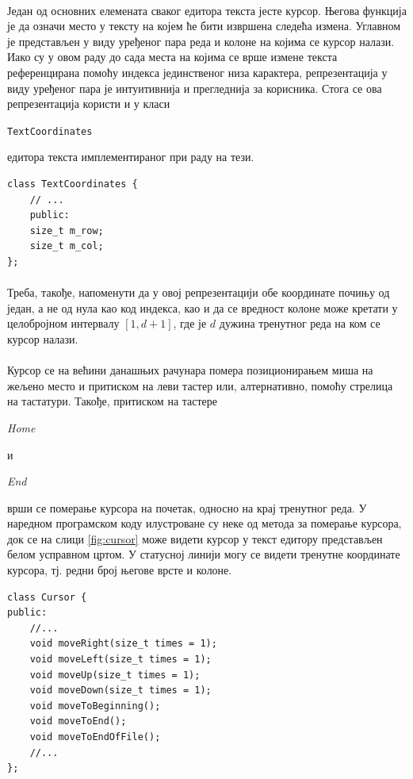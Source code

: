 \documentclass[12pt,oneside]{memoir}
\begin{document}
\paragraph{}
Један од основних елемената сваког едитора текста јесте курсор. Његова функција је да
означи место у тексту на којем ће бити извршена следећа измена. Углавном је представљен у виду уређеног пара реда и колоне на којима се курсор налази. Иако су у овом раду до сада места на којима се врше измене текста референцирана помоћу индекса јединственог низа карактера, репрезентација у виду уређеног пара је интуитивнија и прегледнија за корисника.
Стога се ова репрезентација користи и у класи
\begin{latinica}\verb|TextCoordinates|\end{latinica} едитора текста имплементираног
при раду на тези.

\begin{verbatim}
class TextCoordinates {
	// ...
	public:
	size_t m_row;
	size_t m_col;
};
\end{verbatim}

\paragraph{}
Треба, такође, напоменути да у овој репрезентацији обе координате почињу од
један, а не од нула као код индекса, као и да се вредност колоне може кретати
у целобројном интервалу \([1, d+1]\), где је \(d\) дужина тренутног реда на ком се
курсор налази.

\paragraph{}
Курсор се на већини данашњих рачунара помера позиционирањем миша на жељено место
и притиском на леви тастер или, алтернативно, помоћу стрелица на тастатури. Такође, 
притиском на тастере \begin{latinica}\textit{Home}\end{latinica} и
\begin{latinica}\textit{End}\end{latinica} врши се померање курсора на почетак, односно на крај тренутног реда. У наредном програмском коду илустроване су неке од метода за померање
курсора, док се на слици \ref{fig:cursor} може видети курсор у текст едитору представљен
белом усправном цртом. У статусној линији могу се видети тренутне координате курсора, тј. редни број његове врсте и колоне.

\begin{verbatim}
class Cursor {
public:
	//...
	void moveRight(size_t times = 1);
	void moveLeft(size_t times = 1);
	void moveUp(size_t times = 1);
	void moveDown(size_t times = 1);
	void moveToBeginning();
	void moveToEnd();
	void moveToEndOfFile();
	//...
};
\end{verbatim}
\end{document}
